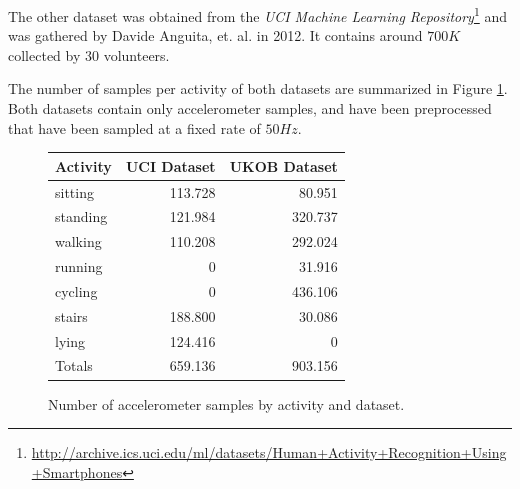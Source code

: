 The other dataset was obtained from the {\it UCI Machine Learning
  Repository}\footnote{\url{http://archive.ics.uci.edu/ml/datasets/Human+Activity+Recognition+Using+Smartphones}}
and was gathered by Davide Anguita, et. al. \cite{Anguita} in 2012.
It contains around $700K$ collected by 30 volunteers.

The number of samples per activity of both datasets are summarized in
Figure \ref{fig:har_datasets}. Both datasets contain only
accelerometer samples, and have been preprocessed that have been
sampled at a fixed rate of $50Hz$.

\begin{figure}
\centering
\begin{tabular}{|l|r|r|} \hline
Activity  & UCI Dataset & UKOB Dataset \\ \hline
sitting   & 113.728     & 80.951        \\
standing  & 121.984     & 320.737       \\
walking   & 110.208     & 292.024       \\
running   & 0           & 31.916        \\
cycling   & 0           & 436.106       \\
stairs    & 188.800     & 30.086        \\
lying     & 124.416     & 0            \\ \hline \hline
Totals    & 659.136     & 903.156       \\ \hline
\end{tabular}

\caption{Number of accelerometer samples by activity and dataset.}
\label{fig:har_datasets}
\end{figure}

